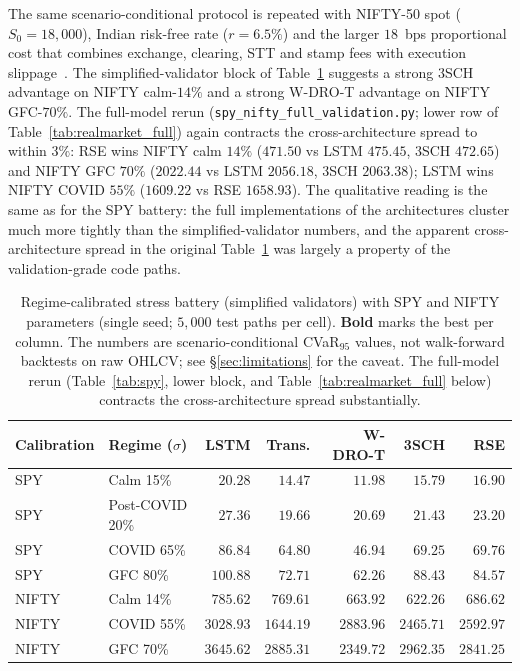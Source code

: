 \documentclass[10pt,letterpaper]{article}
\begin{document}
The same scenario-conditional protocol is repeated with NIFTY-50
spot ($S_0\!=\!18{,}000$), Indian risk-free rate ($r\!=\!6.5\%$)
and the larger $18$~bps proportional cost that combines exchange,
clearing, STT and stamp fees with execution
slippage~\citep{nse2024fees}. The simplified-validator block of
Table~\ref{tab:realmarket} suggests a strong 3SCH advantage on
NIFTY calm-$14\%$ and a strong W-DRO-T advantage on NIFTY
GFC-$70\%$. The full-model rerun
(\texttt{spy\_nifty\_full\_validation.py}; lower row of
Table~\ref{tab:realmarket_full}) again contracts the
cross-architecture spread to within $3\%$: RSE wins NIFTY calm
$14\%$ ($471.50$ vs LSTM $475.45$, 3SCH $472.65$) and NIFTY GFC
$70\%$ ($2022.44$ vs LSTM $2056.18$, 3SCH $2063.38$); LSTM wins
NIFTY COVID $55\%$ ($1609.22$ vs RSE $1658.93$). The qualitative
reading is the same as for the SPY battery: the full
implementations of the architectures cluster much more tightly
than the simplified-validator numbers, and the apparent
cross-architecture spread in the original Table~\ref{tab:realmarket}
was largely a property of the validation-grade code paths.

\begin{table}[ht]
\centering\small
\caption{Regime-calibrated stress battery (simplified validators)
with SPY and NIFTY parameters (single seed; $5{,}000$ test paths
per cell). \textbf{Bold} marks the best per column. The numbers
are scenario-conditional CVaR$_{95}$ values, not walk-forward
backtests on raw OHLCV; see \S\ref{sec:limitations} for the
caveat. The full-model rerun (Table~\ref{tab:spy}, lower block,
and Table~\ref{tab:realmarket_full} below) contracts the
cross-architecture spread substantially.}
\label{tab:realmarket}
\begin{tabular}{@{}llrrrrr@{}}
\toprule
\textbf{Calibration} & \textbf{Regime ($\sigma$)} & \textbf{LSTM} & \textbf{Trans.} & \textbf{W-DRO-T} & \textbf{3SCH} & \textbf{RSE} \\\midrule
SPY    & Calm 15\%        & $20.28$  & $14.47$  & $\mathbf{11.98}$  & $15.79$  & $16.90$ \\
SPY    & Post-COVID 20\%  & $27.36$  & $\mathbf{19.66}$  & $20.69$  & $21.43$  & $23.20$ \\
SPY    & COVID 65\%       & $86.84$  & $64.80$  & $\mathbf{46.94}$  & $69.25$  & $69.76$ \\
SPY    & GFC 80\%         & $100.88$ & $72.71$  & $\mathbf{62.26}$  & $88.43$  & $84.57$ \\
NIFTY  & Calm 14\%        & $785.62$ & $769.61$ & $663.92$ & $\mathbf{622.26}$ & $686.62$ \\
NIFTY  & COVID 55\%       & $3028.93$& $\mathbf{1644.19}$& $2883.96$& $2465.71$& $2592.97$ \\
NIFTY  & GFC 70\%         & $3645.62$& $2885.31$& $\mathbf{2349.72}$& $2962.35$& $2841.25$ \\
\bottomrule
\end{tabular}
\end{table}
\end{document}
